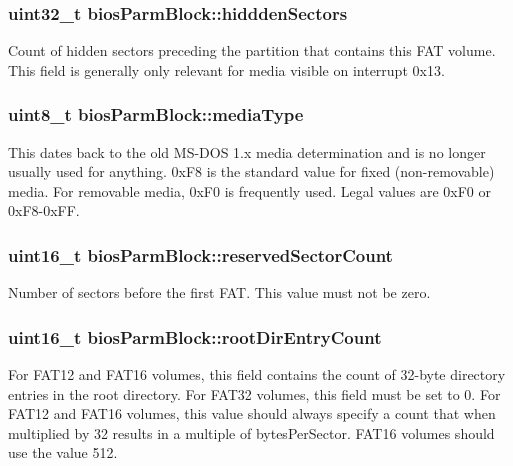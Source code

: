 \subsubsection[{hiddden\+Sectors}]{\setlength{\rightskip}{0pt plus 5cm}uint32\+\_\+t bios\+Parm\+Block\+::hiddden\+Sectors}\label{structbios_parm_block_a9413199be8525190d40589f60c22bcab}
Count of hidden sectors preceding the partition that contains this F\+A\+T volume. This field is generally only relevant for media visible on interrupt 0x13. \hypertarget{structbios_parm_block_a4237e7c3ba247516d546c149954e5042}{}
\subsubsection[{media\+Type}]{\setlength{\rightskip}{0pt plus 5cm}uint8\+\_\+t bios\+Parm\+Block\+::media\+Type}\label{structbios_parm_block_a4237e7c3ba247516d546c149954e5042}
This dates back to the old M\+S-\/\+D\+O\+S 1.\+x media determination and is no longer usually used for anything. 0x\+F8 is the standard value for fixed (non-\/removable) media. For removable media, 0x\+F0 is frequently used. Legal values are 0x\+F0 or 0x\+F8-\/0x\+F\+F. \hypertarget{structbios_parm_block_adb4830c345b27293c7d7b97b77f52e01}{}
\subsubsection[{reserved\+Sector\+Count}]{\setlength{\rightskip}{0pt plus 5cm}uint16\+\_\+t bios\+Parm\+Block\+::reserved\+Sector\+Count}\label{structbios_parm_block_adb4830c345b27293c7d7b97b77f52e01}
Number of sectors before the first F\+A\+T. This value must not be zero. \hypertarget{structbios_parm_block_a9a1b24bb2dbb3a123c4ffc703954d71d}{}
\subsubsection[{root\+Dir\+Entry\+Count}]{\setlength{\rightskip}{0pt plus 5cm}uint16\+\_\+t bios\+Parm\+Block\+::root\+Dir\+Entry\+Count}\label{structbios_parm_block_a9a1b24bb2dbb3a123c4ffc703954d71d}
For F\+A\+T12 and F\+A\+T16 volumes, this field contains the count of 32-\/byte directory entries in the root directory. For F\+A\+T32 volumes, this field must be set to 0. For F\+A\+T12 and F\+A\+T16 volumes, this value should always specify a count that when multiplied by 32 results in a multiple of bytes\+Per\+Sector. F\+A\+T16 volumes should use the value 512. \hypertarget{structbios_parm_block_a45d5e2d8c93a028a074e8ce3dc751ab5}{}
